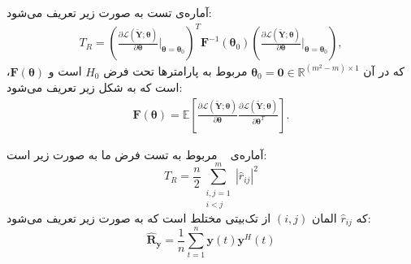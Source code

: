 آماره‌ی تست  به صورت زیر تعریف می‌شود:
\begin{align}
	T_R 
	= \left(
	\frac{\partial\mathcal{L}(\tilde{\mathbf{Y}};\boldsymbol{\theta})}{\partial\boldsymbol{\theta}}
	\Big|_{\boldsymbol{\theta}=\boldsymbol{\theta}_0}
	\right)^T
	\mathbf{F}^{-1}(\boldsymbol{\theta}_0)
	\left(
	\frac{\partial\mathcal{L}(\tilde{\mathbf{Y}};\boldsymbol{\theta})}{\partial\boldsymbol{\theta}}
	\Big|_{\boldsymbol{\theta}=\boldsymbol{\theta}_0}
	\right),
\end{align}
که در آن
$\boldsymbol{\theta}_0=\mathbf{0}\in\mathbb{R}^{(m^2-m)\times1}$
مربوط به پارامترها تحت فرض
$H_0$
است و
$\mathbf{F}(\boldsymbol{\theta})$،
 است که به شکل زیر تعریف می‌شود:
\begin{align}
	\mathbf{F}(\boldsymbol{\theta})
	= \mathbb{E}\!\left[
	\frac{\partial\mathcal{L}(\tilde{\mathbf{Y}};\boldsymbol{\theta})}{\partial\boldsymbol{\theta}}
	\frac{\partial\mathcal{L}(\tilde{\mathbf{Y}};\boldsymbol{\theta})}{\partial\boldsymbol{\theta}^T}
	\right].
\end{align}
\begin{قضیه}
	آماره‌ی \  مربوط به تست فرض ما به صورت زیر است:
	\begin{equation}
		T_R=\frac{n}{2}\sum_{\substack{i,j=1\\i<j}}^{m} \left|\hat{r}_{ij}\right|^2 \label{eq:rao}
	\end{equation}
	که 
	$\hat{r}_{ij}$
	المان 
	$(i,j)$
	از  تک‌بیتی مختلط است که به صورت زیر تعریف می‌شود:
	\begin{equation}
		\hat{\mathbf{R}}_\mathbf{y}=\frac{1}{n}\sum_{t=1}^{n} \mathbf{y}(t)\mathbf{y}^H(t) \label{eq:SCMRy}
	\end{equation}
\end{قضیه}
